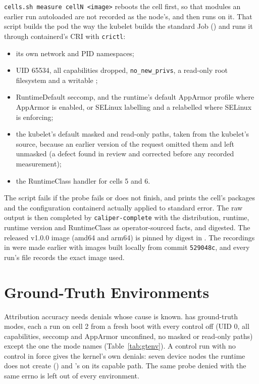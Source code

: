 \texttt{cells.sh measure cellN <image>} reboots the cell first, so that modules an earlier run autoloaded are not recorded as the node's, and then runs  on it. That script builds the pod the way the kubelet builds the standard Job () and runs it through containerd's CRI with \texttt{crictl}:
\begin{itemize}[leftmargin=*]
\item its own network and PID namespaces;
\item UID 65534, all capabilities dropped, \texttt{no\_new\_privs}, a read-only root filesystem and a writable ;
\item RuntimeDefault seccomp, and the runtime's default AppArmor profile where AppArmor is enabled, or SELinux labelling and a relabelled  where SELinux is enforcing;
\item the kubelet's default masked and read-only paths, taken from the kubelet's source, because an earlier version of the request omitted them and left  unmasked (a defect found in review and corrected before any recorded measurement);
\item the RuntimeClass handler for cells 5 and 6.
\end{itemize}
The script fails if the probe fails or does not finish, and prints the cell's packages and the configuration containerd actually applied to standard error. The raw output is then completed by \texttt{caliper-complete} with the distribution, runtime, runtime version and RuntimeClass as operator-sourced facts, and digested. The released v1.0.0 image (amd64 and arm64) is pinned by digest in . The recordings in  were made earlier with images built locally from commit \texttt{529048c}, and every run's  file records the exact image used.

\section{Ground-Truth Environments}

Attribution accuracy needs denials whose cause is known.  has ground-truth modes, each a run on cell 2 from a fresh boot with every control off (UID 0, all capabilities, seccomp and AppArmor unconfined, no masked or read-only paths) except the one the mode names (Table~\ref{tab:gtenv}). A control run with no control in force gives the kernel's own denials: seven device nodes the runtime does not create () and 's  on its capable path. The same probe denied with the same errno is left out of every environment.

